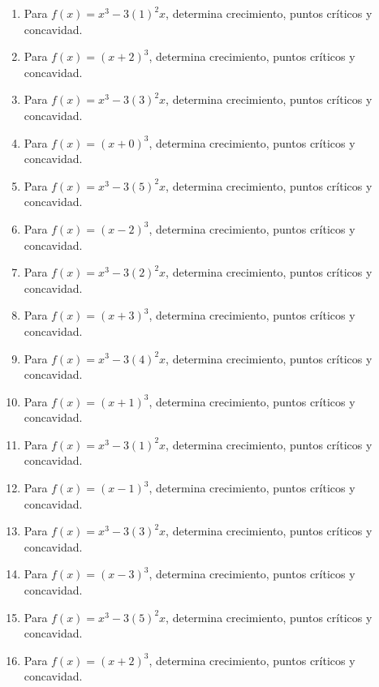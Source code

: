 \documentclass[11pt,a4paper]{article}
\begin{document}
\begin{enumerate}[label=\textbf{E\arabic*.},start=121]

\item Para $f(x)=x^3-3(1)^2x$, determina crecimiento, puntos críticos y concavidad.

\item Para $f(x)=(x+2)^3$, determina crecimiento, puntos críticos y concavidad.

\item Para $f(x)=x^3-3(3)^2x$, determina crecimiento, puntos críticos y concavidad.

\item Para $f(x)=(x+0)^3$, determina crecimiento, puntos críticos y concavidad.

\item Para $f(x)=x^3-3(5)^2x$, determina crecimiento, puntos críticos y concavidad.

\item Para $f(x)=(x-2)^3$, determina crecimiento, puntos críticos y concavidad.

\item Para $f(x)=x^3-3(2)^2x$, determina crecimiento, puntos críticos y concavidad.

\item Para $f(x)=(x+3)^3$, determina crecimiento, puntos críticos y concavidad.

\item Para $f(x)=x^3-3(4)^2x$, determina crecimiento, puntos críticos y concavidad.

\item Para $f(x)=(x+1)^3$, determina crecimiento, puntos críticos y concavidad.

\item Para $f(x)=x^3-3(1)^2x$, determina crecimiento, puntos críticos y concavidad.

\item Para $f(x)=(x-1)^3$, determina crecimiento, puntos críticos y concavidad.

\item Para $f(x)=x^3-3(3)^2x$, determina crecimiento, puntos críticos y concavidad.

\item Para $f(x)=(x-3)^3$, determina crecimiento, puntos críticos y concavidad.

\item Para $f(x)=x^3-3(5)^2x$, determina crecimiento, puntos críticos y concavidad.

\item Para $f(x)=(x+2)^3$, determina crecimiento, puntos críticos y concavidad.


\end{enumerate}
\end{document}
